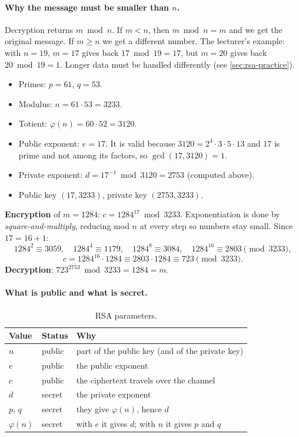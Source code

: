 \paragraph{Why the message must be smaller than $n$.} Decryption returns $m \bmod n$. If $m < n$, then $m \bmod n = m$ and we get the original message. If $m \ge n$ we get a different number. The lecturer's example: with $n=19$, $m=17$ gives back $17 \bmod 19 = 17$, but $m=20$ gives back $20 \bmod 19 = 1$. Longer data must be handled differently (see \cref{sec:rsa-practice}).

\begin{example}
\label{ex:rsa-small}
\leavevmode
\begin{itemize}
    \item Primes: $p = 61$, $q = 53$.
    \item Modulus: $n = 61 \cdot 53 = 3233$.
    \item Totient: $\varphi(n) = 60 \cdot 52 = 3120$.
    \item Public exponent: $e = 17$. It is valid because $3120 = 2^4 \cdot 3 \cdot 5 \cdot 13$ and 17 is prime and not among its factors, so $\gcd(17, 3120) = 1$.
    \item Private exponent: $d = 17^{-1} \bmod 3120 = 2753$ (computed above).
    \item Public key $(17, 3233)$, private key $(2753, 3233)$.
\end{itemize}
\textbf{Encryption} of $m = 1284$: $c = 1284^{17} \bmod 3233$. Exponentiation is done by \emph{square-and-multiply}, reducing mod $n$ at every step so numbers stay small. Since $17 = 16 + 1$:
\[
1284^2 \equiv 3059,\quad 1284^4 \equiv 1179,\quad 1284^8 \equiv 3084,\quad 1284^{16} \equiv 2803 \pmod{3233},
\]
\[
c = 1284^{16} \cdot 1284 \equiv 2803 \cdot 1284 \equiv 723 \pmod{3233}.
\]
\textbf{Decryption}: $723^{2753} \bmod 3233 = 1284 = m$.
\end{example}

\paragraph{What is public and what is secret.}
\begin{table}[H]
\centering
\caption{RSA parameters.}
\label{tab:rsa-params}
\begin{tabular}{@{}lll@{}}
\toprule
Value & Status & Why \\
\midrule
$n$          & public & part of the public key (and of the private key) \\
$e$          & public & the public exponent \\
$c$          & public & the ciphertext travels over the channel \\
$d$          & secret & the private exponent \\
$p$, $q$     & secret & they give $\varphi(n)$, hence $d$ \\
$\varphi(n)$ & secret & with $e$ it gives $d$; with $n$ it gives $p$ and $q$ \\
\bottomrule
\end{tabular}
\end{table}

